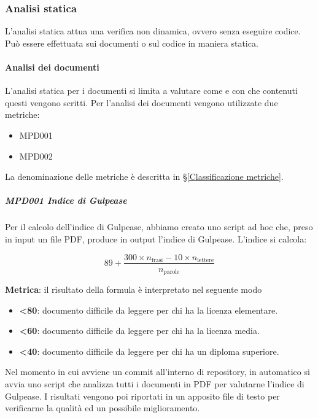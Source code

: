 
		\subsubsection{Analisi statica}\label{AnalisiStatica}
		L'analisi statica attua una verifica non dinamica, ovvero senza eseguire codice.
		Può essere effettuata sui documenti o sul codice in maniera statica. 


			\paragraph{Analisi dei documenti}\label{ProcessiSupportoMetriche}
			L'analisi statica per i documenti si limita a valutare come e con che contenuti questi vengono scritti.
			Per l'analisi dei documenti vengono utilizzate due metriche:

			\begin{itemize}
				\item MPD001
				\item MPD002
			\end{itemize}
			
			La denominazione delle metriche è descritta in \S\ref{Classificazione metriche}.

			\subparagraph{MPD001 Indice di Gulpease}\label{AnalisiStatica:Gulpease}
			Per il calcolo dell'indice di Gulpease, abbiamo creato uno script ad hoc che, preso in input un file PDF, produce in output l'indice di Gulpease.
			L'indice si calcola:

			\[89+\dfrac{300\times n_{\text{frasi}}-10\times n_{\text{lettere}}}{n_{\text{parole}}}\]
			
			\textbf{Metrica}: il risultato della formula è interpretato nel seguente modo

			\begin{itemize}
				\item \textbf{<80}: documento  difficile da leggere per chi ha la licenza elementare.
				\item \textbf{<60}: documento  difficile da leggere per chi ha la licenza media.
				\item \textbf{<40}: documento difficile da leggere per chi ha un diploma superiore.
			\end{itemize}

			Nel momento in cui avviene un commit all'interno di repository, in automatico si avvia uno script che analizza tutti i documenti in PDF per valutarne
			l'indice di Gulpease. I risultati vengono poi riportati in un apposito file di testo per verificarne la qualità ed un possibile miglioramento.

